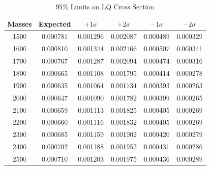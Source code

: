 \documentclass{article}
\begin{document}
\begin{table}[h!]
\caption{95\% Limits on LQ Cross Section}
\label{tab:limits}
\begin{tabular}{c||c|cccc}
\toprule
Masses & Expected & $+1\sigma$ & $+2\sigma$ & $-1\sigma$ & $-2\sigma$ \\
\midrule
1500 & 0.000781 & 0.001296 & 0.002087 & 0.000489 & 0.000329 \\
1600 & 0.000810 & 0.001344 & 0.002166 & 0.000507 & 0.000341 \\
1700 & 0.000767 & 0.001287 & 0.002094 & 0.000474 & 0.000316 \\
1800 & 0.000665 & 0.001108 & 0.001795 & 0.000414 & 0.000278 \\
1900 & 0.000635 & 0.001064 & 0.001734 & 0.000393 & 0.000263 \\
2000 & 0.000647 & 0.001090 & 0.001782 & 0.000399 & 0.000265 \\
2100 & 0.000659 & 0.001113 & 0.001825 & 0.000405 & 0.000269 \\
2200 & 0.000660 & 0.001116 & 0.001832 & 0.000405 & 0.000269 \\
2300 & 0.000685 & 0.001159 & 0.001902 & 0.000420 & 0.000279 \\
2400 & 0.000702 & 0.001188 & 0.001952 & 0.000431 & 0.000286 \\
2500 & 0.000710 & 0.001203 & 0.001975 & 0.000436 & 0.000289 \\
\bottomrule
\end{tabular}
\end{table}
\end{document}
